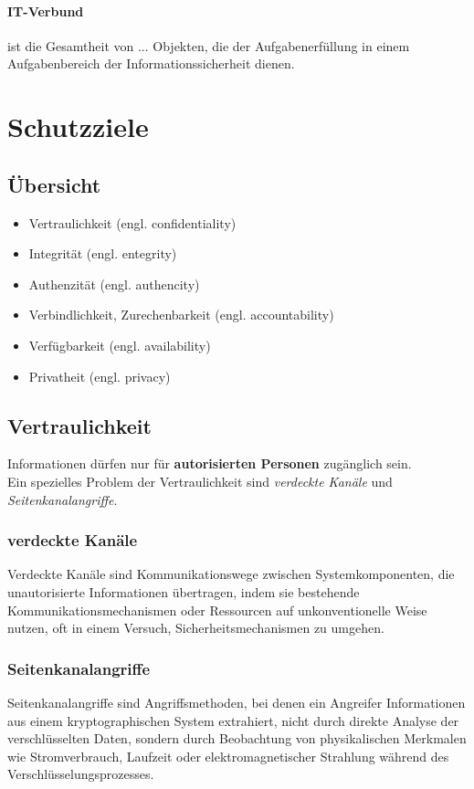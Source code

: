 \documentclass{book}
\begin{document}
\paragraph{IT-Verbund} ist die Gesamtheit von ... Objekten, die der Aufgabenerfüllung in einem Aufgabenbereich der Informationssicherheit dienen.

\section{Schutzziele}
\subsection{Übersicht}
\begin{itemize}
    \item Vertraulichkeit (engl. confidentiality)
    \item Integrität (engl. entegrity)
    \item Authenzität (engl. authencity)
    \item Verbindlichkeit, Zurechenbarkeit (engl. accountability)
    \item Verfügbarkeit (engl. availability)
    \item Privatheit (engl. privacy)
\end{itemize}
\subsection{Vertraulichkeit} 
Informationen dürfen nur für \textbf{autorisierten Personen} zugänglich sein. \\
Ein spezielles Problem der Vertraulichkeit sind \textit{verdeckte Kanäle} und \textit{Seitenkanalangriffe}.
\subsubsection{verdeckte Kanäle}
Verdeckte Kanäle sind Kommunikationswege zwischen Systemkomponenten, die unautorisierte Informationen übertragen,
indem sie bestehende Kommunikationsmechanismen oder Ressourcen auf unkonventionelle Weise nutzen, oft in einem Versuch, Sicherheitsmechanismen zu umgehen.
\subsubsection{Seitenkanalangriffe}
Seitenkanalangriffe sind Angriffsmethoden, bei denen ein Angreifer Informationen aus einem kryptographischen System extrahiert, nicht durch direkte Analyse der verschlüsselten Daten, sondern durch 
Beobachtung von physikalischen Merkmalen wie Stromverbrauch, Laufzeit oder elektromagnetischer Strahlung während des Verschlüsselungsprozesses.
\end{document}

